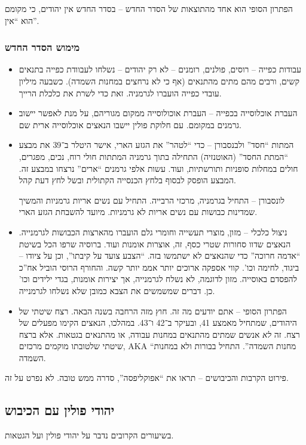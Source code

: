 \documentclass[a4paper]{book}
\begin{document}
	הפתרון הסופי הוא אחד מהתוצאות של הסדר החדש – בסדר החדש אין יהודים, כי מקומם הוא ``אין''. 
	
	\subsubsection{מימוש הסדר החדש}
	\begin{itemize}
		\item עבודות כפייה – רוסים, פולנים, רומנים – לא רק יהודים – נשלחו לעבוודת כפייה בתנאים קשים, ורבים מהם מתים מהתנאים (אף כי לא נרחצים במחנות השמדה). כשבעה מיליון עובדי כפייה הועברו לגרמניה. זאת כדי לשרת את כלכלת הרייך. 
		\item העברת אוכלוסייה בכפייה – העברת אוכולוסייה ממקום מגוריהם, על מנת לאפשר יישוב גרמנים במקומם. עם חלוקת פולין יישבו הנאצים אוכלוסייה ארית שם. 
		\item המתות ``חסד'' ולבנסבורן – כדי ``לטהר'' את הגזע הארי, אישר היטלר ב־39 את מבצע ``המתת החסד'' (האוטנזיה) התחילה בתוך גרמניה המתתות חולי רוח, נכים, מפגרים, חולים במחלות סופניות ותורשתיות, ועוד. עשות אלפי גרמנים ``ארים'' נרצחו במבצע זה. המבצע הופסק לבסוף בלחץ הכנסייה הקתולית ובשל לחץ דעת קהל. 
		
		לונסבורן – התחיל בגרמניה, מרכזי הרבייה. התחיל עם נשים אריות גרמניות והמשיך שמדינות כבושות עם נשים אריות לא גרמניות. מיועד להשבחת הגזע הארי. 
		\item ניצול כלכלי – מזון, מוצרי תעשייה וחומרי גלם הועברו מהארצות הכבושות לגרמנייה. הנאצים שדוו סחורות שטרי כסף, זה, אוצרות אומנות ועוד. ברוסיה שרפו הכל בשיטת ``אדמה חרוכה'' כדי שהנאצים לא ישתמשו בזה. ``הצבע צועד על קיבתו'', וכן על ציודו – ביגוד, לחימה וכו'. קווי אספקה ארוכים יותר אממ יותר קשה. והחורף הרוסי הוביל אח''כ להפסדם באוסייה. מזון לדוגמה, לא נשלח לגרמנייה, אך יצירות אומנות, בגדי ילידים וכו' כן. דברים שמשמשים את הצבא כמובן שלא נשלחו לגרמנייה. 
		\item הפתרון הסופי – אתם יודעים מה זה. חוץ מזה הרחבה בשנה הבאה. רצח שיטתי של היהודים, שמתחיל מאמצע 41, ובעיקר ב־42 ו־43. במהלכו, הנאצים הקימו מפעלים של רצח. זה \textit{לא} אנשים שמתים מהתנאים במחנות עבודה, או מהתנאים בגטאות. אלא ברצח שיטתי שלטובתו מוקמים מרכזים, AKA ``מחנות השמדה''. התחיל בבורות ולא במחנות השמדה. 
	\end{itemize}
	
	פירוט הקרבות והכיבושים – תראו את ``אפוקליפסה'', סדרה ממש טובה. לא נפרט על זה. 
	
	\subsection{יהודי פולין עם הכיבוש}
	בשיעורים הקרובים נדבר על יהודי פולין ועל הגטאות. 
\end{document}
